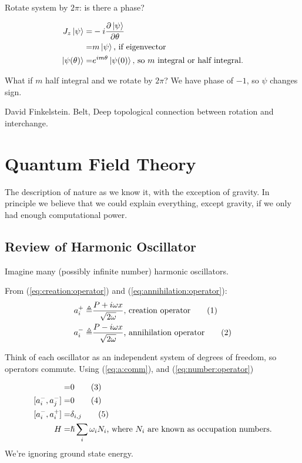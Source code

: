 \documentclass[]{article}
\newcommand\numberthis{\addtocounter{equation}{1}\tag{\theequation}}
\begin{document}
Rotate system by $2\pi$: is there a phase?

\begin{align*}
J_z\ket{\psi} =& -i \frac{\partial \ket{\psi}}{\partial \theta}\\
=& m\ket{\psi} \text{, if eigenvector}\\
\ket{\psi(\theta)} =& e^{im\theta}\ket{\psi(0)}\text{, so $m$ integral or half integral.}
\end{align*}

What if $m$ half integral and we rotate by $2\pi$? We have phase of $-1$, so $\psi$ changes sign.

David Finkelstein. Belt, Deep topological connection between rotation and interchange.

\section{Quantum Field Theory}

The description of nature as we know it, with the exception of gravity. In principle we believe that we could explain everything, except gravity, if we only had enough computational power.

\subsection{Review of Harmonic Oscillator}
Imagine many (possibly infinite number) harmonic oscillators.

From (\ref{eq:creation:operator}) and (\ref{eq:annihilation:operator}):
\begin{align*}
a^+_i \triangleq & \frac{P + i \omega x } {\sqrt{2 \omega}} \text{, creation operator} \numberthis \label{eq:creation:operator:i}\\
a^-_i \triangleq & \frac{P - i \omega x } {\sqrt{2 \omega}}\text{, annihilation operator} \numberthis \label{eq:annihilation:operator_i}\\
\end{align*}

Think of each oscillator  as an independent system of degrees of freedom, so operators commute. Using  (\ref{eq:a:comm}), and (\ref{eq:number:operator})

\begin{align*}
[a^+_i,a^+_j] =& 0 \numberthis \label{eq:a:comm_i_plus}\\
[a^-_i,a^-_j] =& 0 \numberthis \label{eq:a:comm_i_minus}\\
[a^-_i,a^+_i] =& \delta_{i,j} \numberthis \label{eq:a:comm_i}\\
H =& \hslash \sum_{i}  \omega_i N_i\text{, where $N_i$ are known as occupation numbers.}
\end{align*}
We're ignoring ground state energy.
\end{document}
